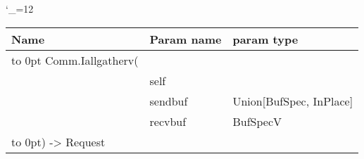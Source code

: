 \begingroup \catcode`\_=12 \tt
\begin{tabular}{lll}
\toprule
\textrm{Name}&\textrm{Param name}&\textrm{param type}\\
\midrule
\hbox to 0pt {Comm.Iallgatherv(\hss}\\
& self\\
& sendbuf & Union[BufSpec, InPlace]\\
& recvbuf & BufSpecV\\
\hbox to 0pt{) -> Request\hss}\\
\bottomrule
\end{tabular}
\endgroup

